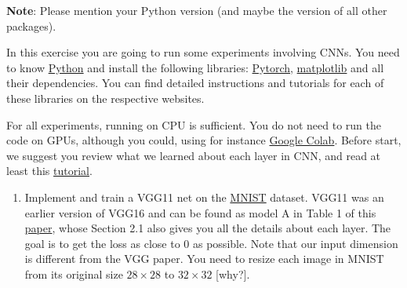 \documentclass[10pt]{article}
\newcommand{\blue}[1]{{\color{blue}#1}}
\newcommand{\magenta}[1]{{\color{magenta}#1}}
\begin{document}
	\begin{exercise}
		\blue{\textbf{Note}: Please mention your Python version (and maybe the version of all other packages).}
		
		In this exercise you are going to run some experiments involving CNNs. You need to know \href{https://www.python.org/}{\magenta{Python}} and install the following libraries: \href{https://pytorch.org/get-started/locally/}{\magenta{Pytorch}}, \href{https://matplotlib.org/}{\magenta{matplotlib}} and all their dependencies. You can find detailed instructions and tutorials for each of these libraries on the respective websites. 
	
		For all experiments, running on CPU is sufficient. You do not need to run the code on GPUs, although you could, using for instance \href{https://colab.research.google.com/}{Google Colab}.
		Before start, we suggest you review what we learned about each layer in CNN, and read at least this \href{https://pytorch.org/tutorials/beginner/blitz/neural_networks_tutorial.html}{\magenta{tutorial}}.
	
		\begin{enumerate}
			\item Implement and train a VGG11 net on the \href{https://pytorch.org/vision/stable/datasets.html#mnist}{\magenta{MNIST}} dataset. 
			VGG11 was an earlier version of VGG16 and can be found as model A in Table 1 of this \href{https://arxiv.org/pdf/1409.1556.pdf}{\magenta{paper}}, whose Section 2.1 also gives you all the details about each layer.
			The goal is to get the loss as close to 0 as possible. Note that our input dimension is different from the VGG paper. You need to resize each image in MNIST from its original size $28 \times 28$ to $32 \times 32$ [why?].
	

\end{enumerate}
\end{exercise}
\end{document}
